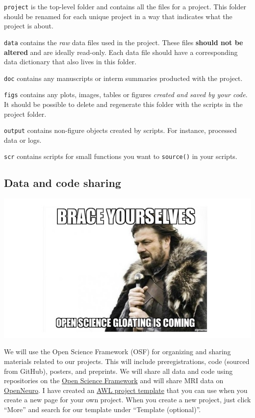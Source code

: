 \documentclass[]{book}
\begin{document}
\texttt{project} is the top-level folder and contains all the files for a project. This folder should be renamed for each unique project in a way that indicates what the project is about.

\texttt{data} contains the \emph{raw} data files used in the project. These files \textbf{should not be altered} and are ideally read-only. Each data file should have a corresponding data dictionary that also lives in this folder.

\texttt{doc} contains any manuscripts or interm summaries producted with the project.

\texttt{figs} contains any plots, images, tables or figures \emph{created and saved by your code}. It should be possible to delete and regenerate this folder with the scripts in the project folder.

\texttt{output} contains non-figure objects created by scripts. For instance, processed data or logs.

\texttt{scr} contains scripts for small functions you want to \texttt{source()} in your scripts.

\hypertarget{data-and-code-sharing}{%
\subsection{Data and code sharing}\label{data-and-code-sharing}}

\includegraphics{images/open_science.jpg}

We will use the Open Science Framework (OSF) for organizing and sharing materials related to our projects. This will include preregistrations, code (sourced from GitHub), posters, and preprints. We will share all data and code using repositories on the \href{https://osf.io/}{Open Science Framework} and will share MRI data on \href{https://openneuro.org/}{OpenNeuro}. I have created an \href{https://osf.io/ce8p4/}{AWL project template} that you can use when you create a new page for your own project. When you create a new project, just click ``More'' and search for our template under ``Template (optional)''.
\end{document}
